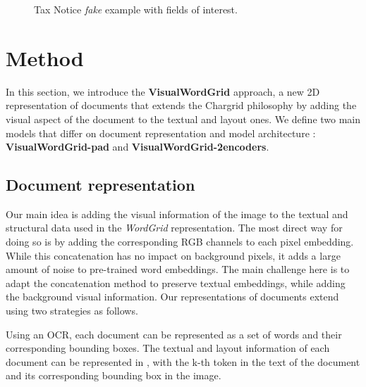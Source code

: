 \documentclass[runningheads]{llncs}
\begin{document}
\begin{figure}[!h]
\begin{minipage}[t]{0.5\linewidth}
    \centering
     {\setlength{\fboxsep}{0pt}\setlength{\fboxrule}{1pt}}\label{f21}
\end{minipage}
\hspace{0.1cm}
\begin{minipage}[t]{0.5\linewidth} 
    \centering
     {\setlength{\fboxsep}{0pt}\setlength{\fboxrule}{1pt}}\label{f2}
\end{minipage}     
\caption{Tax Notice \textit{fake} example with fields of interest.}
\label{fig:tax}
\end{figure}  



\section{Method}

In this section, we introduce the \textbf{VisualWordGrid} approach, a new 2D representation of documents that extends the Chargrid philosophy by adding the visual aspect of the document to the textual and layout ones. We define two main models that differ on document representation and model architecture : \textbf{VisualWordGrid-pad} and \textbf{VisualWordGrid-2encoders}.


\subsection{Document representation}
Our main idea is adding the visual information of the image to the textual and structural data used in the \textit{WordGrid} representation. The most direct way for doing so is by adding the corresponding RGB channels to each pixel embedding. While this concatenation has no impact on background pixels, it adds a large amount of noise to pre-trained word embeddings. The main challenge here is to adapt the concatenation method to preserve textual embeddings, while adding the background visual information. Our representations of documents extend \cite{chargrid} using two strategies as follows.

Using an OCR, each document can be represented as a set of words and their corresponding bounding boxes. The textual and layout information of each document can be represented in  , with  the k-th token in the text of the document and  its corresponding bounding box in the image.
\end{document}
